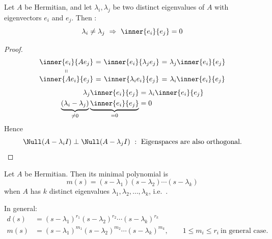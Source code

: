 \begin{theorem}
Let $A$ be Hermitian, and let $\lambda_i,\lambda_j$ be two distinct eigenvalues of $A$ with eigenvectors $e_i$ and $e_j$. Then :
\[
\lambda_i\neq\lambda_j\ \Rightarrow\ \inner{e_i}{e_j}=0
\]
\end{theorem}
\begin{proof}[Proof]
\[
\begin{array}{c@{\ }c@{\ }c@{\ }c@{\ }c}
\inner{e_i}{Ae_j} &=& \inner{e_i}{\lambda_je_j} &=& \lambda_j\inner{e_i}{e_j}\\
\shortparallel & & & & \\
\inner{Ae_i}{e_j} &=& \inner{\lambda_ie_i}{e_j} &=& \lambda_i\inner{e_i}{e_j}
\end{array}
\]
\begin{align*}
\lambda_j\inner{e_i}{e_j}&=\lambda_i\inner{e_i}{e_j}\\
\underbrace{(\lambda_i-\lambda_j)}_{\neq0}\underbrace{\inner{e_i}{e_j}}_{=0}&=0
\end{align*}
Hence
\[
\Null(A-\lambda_iI)\perp\Null(A-\lambda_jI)\ :\ \text{Eigenspaces are also orthogonal.}
\]
\end{proof}

\begin{theorem}
\leavevmode{}Let $A$ be Hermitian. Then its minimal polynomial is
\[
m(s)=(s-\lambda_1)(s-\lambda_2)\cdots(s-\lambda_k)
\]
when $A$ has $k$ distinct eigenvalues $\lambda_1,\lambda_2,\dots,\lambda_k$, i.e.\ .
\end{theorem}
In general:
\begin{align*}
d(s)&=(s-\lambda_1)^{r_1}(s-\lambda_2)^{r_2}\cdots(s-\lambda_k)^{r_k}\\
m(s)&=(s-\lambda_1)^{m_1}(s-\lambda_2)^{m_2}\cdots(s-\lambda_k)^{m_k},\qquad 1\leq m_i\leq r_i\ \text{in general case.}
\end{align*}

